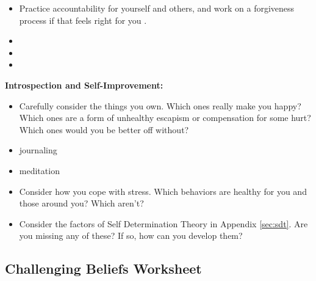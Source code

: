 \documentclass[12pt,letterpaper]{article}
\begin{document}
\begin{itemize}
    \item Practice accountability for yourself and others, and work on a forgiveness process if that feels right for you \cite{mingusAccountability,barnardCommunities,gottmanTrust}.  
    \item {}
    \item {} 
    \item {}
\end{itemize}
\noindent \textbf{Introspection and Self-Improvement:} 
\begin{itemize}
    \item Carefully consider the things you own. Which ones really make you happy? Which ones are a form of unhealthy escapism or compensation for some hurt? Which ones would you be better off without? 
    \item journaling
    \item meditation
    \item Consider how you cope with stress. Which behaviors are healthy for you and those around you? Which aren't?
    \item Consider the factors of Self Determination Theory in Appendix \ref{sec:sdt}. Are you missing any of these? If so, how can you develop them?
\end{itemize}
\subsection{Challenging Beliefs Worksheet}
\label{challenge}

\printbibliography
{}
\end{document}
